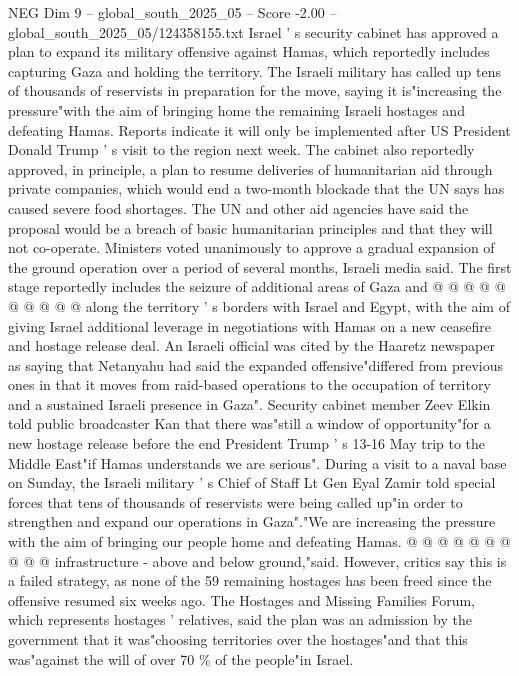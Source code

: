 \begin{textsample}{NEG Dim 9 – global\_south\_2025\_05 – Score -2.00 – global\_south\_2025\_05/124358155.txt}  \label{ex:f9_neg_252}
Israel ' s security cabinet has approved a plan to expand its military offensive against Hamas, which reportedly includes capturing Gaza and holding the territory.
The Israeli military has called up tens of thousands of reservists in preparation for the move, saying it is"increasing the pressure"with the aim of bringing home the remaining Israeli hostages and defeating Hamas.
Reports indicate it will only be implemented after US President Donald Trump ' s visit to the region next week.
The cabinet also reportedly approved, in principle, a plan to resume deliveries of humanitarian aid through private companies, which would end a two-month blockade that the UN says has caused severe food shortages.
The UN and other aid agencies have said the proposal would be a breach of basic humanitarian principles and that they will not co-operate.
Ministers voted unanimously to approve a gradual expansion of the ground operation over a period of several months, Israeli media said.
The first stage reportedly includes the seizure of additional areas of Gaza and @ @ @ @ @ @ @ @ @ @ along the territory ' s borders with Israel and Egypt, with the aim of giving Israel additional leverage in negotiations with Hamas on a new ceasefire and hostage release deal.
An Israeli official was cited by the Haaretz newspaper as saying that Netanyahu had said the expanded offensive"differed from previous ones in that it moves from raid-based operations to the occupation of territory and a sustained Israeli presence in Gaza".
Security cabinet member Zeev Elkin told public broadcaster Kan that there was"still a window of opportunity"for a new hostage release before the end President Trump ' s 13-16 May trip to the Middle East"if Hamas understands we are serious".
During a visit to a naval base on Sunday, the Israeli military ' s Chief of Staff Lt Gen Eyal Zamir told special forces that tens of thousands of reservists were being called up"in order to strengthen and expand our operations in Gaza"."We are increasing the pressure with the aim of bringing our people home and defeating Hamas. @ @ @ @ @ @ @ @ @ @ infrastructure - above and below ground,"said.
However, critics say this is a failed strategy, as none of the 59 remaining hostages has been freed since the offensive resumed six weeks ago.
The Hostages and Missing Families Forum, which represents hostages ' relatives, said the plan was an admission by the government that it was"choosing territories over the hostages"and that this was"against the will of over 70 \% of the people"in Israel.

\end{textsample}
